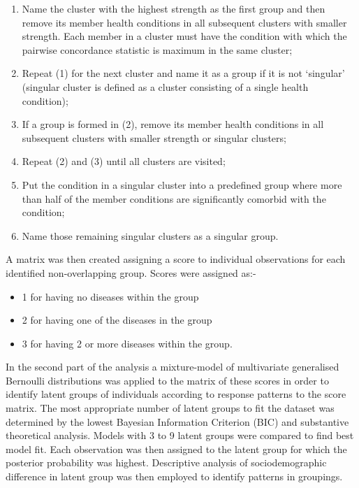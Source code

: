 \documentclass[12pt,]{report}
\providecommand{\tightlist}{%
  \setlength{\itemsep}{0pt}\setlength{\parskip}{0pt}}
\begin{document}
\begin{enumerate}
\def\labelenumi{\arabic{enumi}.}
\tightlist
\item
  Name the cluster with the highest strength as the first group and then
  remove its member health conditions in all subsequent clusters with
  smaller strength. Each member in a cluster must have the condition
  with which the pairwise concordance statistic is maximum in the same
  cluster;
\item
  Repeat (1) for the next cluster and name it as a group if it is not
  `singular' (singular cluster is defined as a cluster consisting of a
  single health condition);\\
\item
  If a group is formed in (2), remove its member health conditions in
  all subsequent clusters with smaller strength or singular clusters;
\item
  Repeat (2) and (3) until all clusters are visited;
\item
  Put the condition in a singular cluster into a predefined group where
  more than half of the member conditions are significantly comorbid
  with the condition;
\item
  Name those remaining singular clusters as a singular group.
\end{enumerate}

A matrix was then created assigning a score to individual observations
for each identified non-overlapping group. Scores were assigned as:-

\begin{itemize}
\tightlist
\item
  1 for having no diseases within the group
\item
  2 for having one of the diseases in the group
\item
  3 for having 2 or more diseases within the group.
\end{itemize}

In the second part of the analysis a mixture-model of multivariate
generalised Bernoulli distributions was applied to the matrix of these
scores in order to identify latent groups of individuals according to
response patterns to the score matrix. The most appropriate number of
latent groups to fit the dataset was determined by the lowest Bayesian
Information Criterion (BIC) and substantive theoretical analysis. Models
with 3 to 9 latent groups were compared to find best model fit. Each
observation was then assigned to the latent group for which the
posterior probability was highest. Descriptive analysis of
sociodemographic difference in latent group was then employed to
identify patterns in groupings.
\end{document}
